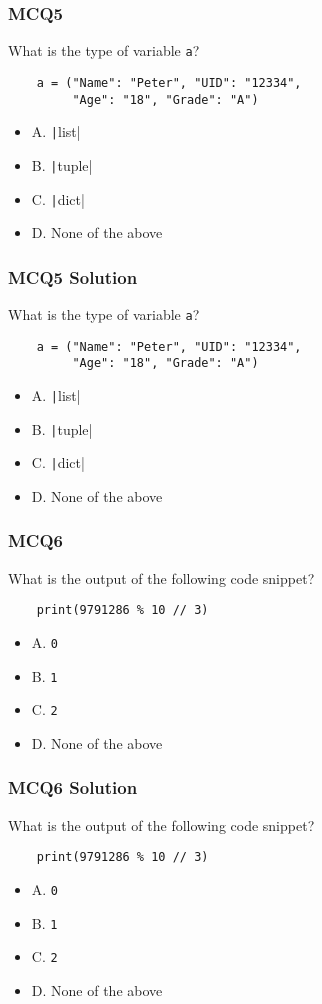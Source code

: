 \documentclass{beamer}
\newcommand{\python}[1]{\texttt|#1|}
\begin{document}
\begin{frame}[fragile]
    \frametitle{MCQ5}
    What is the type of variable \texttt{a}?
    \begin{verbatim}
    a = ("Name": "Peter", "UID": "12334", 
         "Age": "18", "Grade": "A")
    \end{verbatim}
    \begin{itemize}
        \item A. \python{list}
        \item B. \python{tuple}
        \item C. \python{dict}
        \item D. None of the above
    \end{itemize}
\end{frame}
\begin{frame}[fragile]
    \frametitle{MCQ5 Solution}
    What is the type of variable \texttt{a}?
    \begin{verbatim}
    a = ("Name": "Peter", "UID": "12334", 
         "Age": "18", "Grade": "A")
    \end{verbatim}
    \begin{itemize}
        \item A. \python{list}
        \item B. \python{tuple}
        \item C. \python{dict}
        \item \alert{D. None of the above}
    \end{itemize}
\end{frame}

\begin{frame}[fragile]
    \frametitle{MCQ6}
    What is the output of the following code snippet?
    \begin{verbatim}
    print(9791286 % 10 // 3)
    \end{verbatim}
    \begin{itemize}
        \item A. \texttt{0}
        \item B. \texttt{1}
        \item C. \texttt{2}
        \item D. None of the above
    \end{itemize}
\end{frame}
\begin{frame}[fragile]
    \frametitle{MCQ6 Solution}
    What is the output of the following code snippet?
    \begin{verbatim}
    print(9791286 % 10 // 3)
    \end{verbatim}
    \begin{itemize}
        \item A. \texttt{0}
        \item B. \texttt{1}
        \item \alert{C. \texttt{2}}
        \item D. None of the above
    \end{itemize}
\end{frame}
\end{document}
